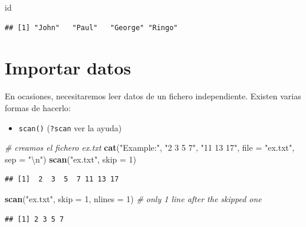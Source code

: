 \documentclass[]{book}
\newenvironment{Shaded}{\begin{snugshade}}{\end{snugshade}}
\newcommand{\KeywordTok}[1]{\textcolor[rgb]{0.13,0.29,0.53}{\textbf{#1}}}
\newcommand{\DataTypeTok}[1]{\textcolor[rgb]{0.13,0.29,0.53}{#1}}
\newcommand{\DecValTok}[1]{\textcolor[rgb]{0.00,0.00,0.81}{#1}}
\newcommand{\CharTok}[1]{\textcolor[rgb]{0.31,0.60,0.02}{#1}}
\newcommand{\StringTok}[1]{\textcolor[rgb]{0.31,0.60,0.02}{#1}}
\newcommand{\CommentTok}[1]{\textcolor[rgb]{0.56,0.35,0.01}{\textit{#1}}}
\newcommand{\NormalTok}[1]{#1}
\providecommand{\tightlist}{%
  \setlength{\itemsep}{0pt}\setlength{\parskip}{0pt}}
\begin{document}
\begin{Shaded}
\begin{Highlighting}[]
\NormalTok{id}
\end{Highlighting}
\end{Shaded}

\begin{verbatim}
## [1] "John"   "Paul"   "George" "Ringo"
\end{verbatim}

\section{Importar datos}\label{importar-datos}

En ocasiones, necesitaremos leer datos de un fichero independiente.
Existen varias formas de hacerlo:

\begin{itemize}
\tightlist
\item
  \texttt{scan()} (\texttt{?scan} ver la ayuda)
\end{itemize}

\begin{Shaded}
\begin{Highlighting}[]
\CommentTok{# creamos el fichero ex.txt}
\KeywordTok{cat}\NormalTok{(}\StringTok{"Example:"}\NormalTok{, }\StringTok{"2 3 5 7"}\NormalTok{, }\StringTok{"11 13 17"}\NormalTok{, }\DataTypeTok{file =} \StringTok{"ex.txt"}\NormalTok{, }\DataTypeTok{sep =} \StringTok{"}\CharTok{\textbackslash{}n}\StringTok{"}\NormalTok{) }
\KeywordTok{scan}\NormalTok{(}\StringTok{"ex.txt"}\NormalTok{, }\DataTypeTok{skip =} \DecValTok{1}\NormalTok{)}
\end{Highlighting}
\end{Shaded}

\begin{verbatim}
## [1]  2  3  5  7 11 13 17
\end{verbatim}

\begin{Shaded}
\begin{Highlighting}[]
\KeywordTok{scan}\NormalTok{(}\StringTok{"ex.txt"}\NormalTok{, }\DataTypeTok{skip =} \DecValTok{1}\NormalTok{, }\DataTypeTok{nlines =} \DecValTok{1}\NormalTok{) }\CommentTok{# only 1 line after the skipped one}
\end{Highlighting}
\end{Shaded}

\begin{verbatim}
## [1] 2 3 5 7
\end{verbatim}
\end{document}
